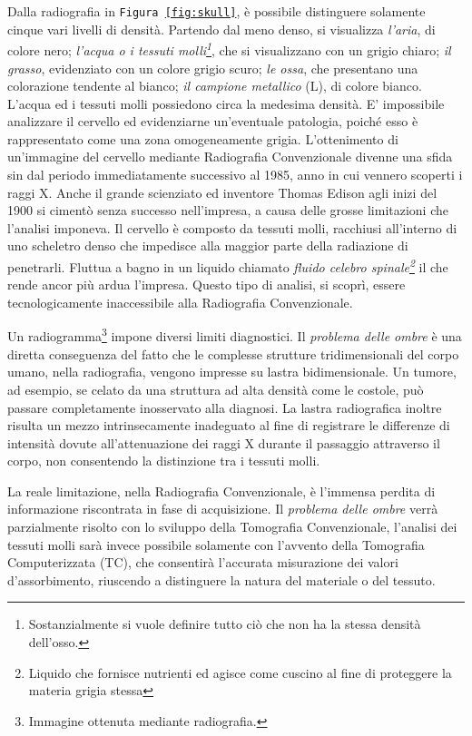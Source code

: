 \documentclass[a4paper,12pt, doubleside]{report}
\begin{document}
                    \bigskip
                    Dalla radiografia in \texttt{Figura \ref{fig:skull}}, è possibile distinguere solamente cinque vari livelli di densità. Partendo dal meno denso, si visualizza \textit{l'aria}, di colore nero; \textit{l'acqua o i tessuti molli\footnote{Sostanzialmente si vuole definire tutto ciò che non ha la stessa densità dell'osso.}}, che si visualizzano con un grigio chiaro; \textit{il grasso}, evidenziato con un colore grigio scuro; \textit{le ossa}, che presentano una colorazione tendente al bianco; \textit{il campione metallico} (L), di colore bianco. L’acqua ed i tessuti molli possiedono circa la medesima densità. E' impossibile analizzare il cervello ed evidenziarne un'eventuale patologia, poiché esso è rappresentato come una zona omogeneamente grigia. L'ottenimento di un'immagine del cervello mediante Radiografia Convenzionale divenne una sfida sin dal periodo immediatamente successivo al 1985, anno in cui vennero scoperti i raggi X. Anche il grande scienziato ed inventore Thomas Edison agli inizi del 1900 si cimentò senza successo nell'impresa, a causa delle grosse limitazioni che l'analisi imponeva.\cite{thomas-edison-brain} Il cervello è composto da tessuti molli, racchiusi all’interno di uno scheletro denso che impedisce alla maggior parte della radiazione di penetrarli. Fluttua a bagno in un liquido chiamato \textit{fluido celebro spinale\footnote{Liquido che fornisce nutrienti ed agisce come cuscino al fine di proteggere la materia grigia stessa}} il che rende ancor più ardua l'impresa. Questo tipo di analisi, si scoprì, essere tecnologicamente inaccessibile alla Radiografia Convenzionale.
                
                \bigskip 
                \par
                    Un radiogramma\footnote{Immagine ottenuta mediante radiografia.} impone diversi limiti diagnostici. Il \textit{problema delle ombre} è una diretta conseguenza del fatto che le complesse strutture tridimensionali del corpo umano, nella radiografia, vengono impresse su lastra bidimensionale. Un tumore, ad esempio, se celato da una struttura ad alta densità come le costole, può passare completamente inosservato alla diagnosi. La lastra radiografica inoltre risulta un mezzo intrinsecamente inadeguato al fine di registrare le differenze di intensità dovute all'attenuazione dei raggi X durante il passaggio attraverso il corpo, non consentendo la distinzione tra i tessuti molli.
                
                \bigskip            
                \par
                    La reale limitazione, nella Radiografia Convenzionale, è l'immensa perdita di informazione riscontrata in fase di acquisizione. Il \textit{problema delle ombre} verrà parzialmente risolto con lo sviluppo della Tomografia Convenzionale, l'analisi dei tessuti molli sarà invece possibile solamente con l'avvento della Tomografia Computerizzata (TC), che consentirà l'accurata misurazione dei valori d'assorbimento, riuscendo a distinguere la natura del materiale o del tessuto.
                            
\end{document}
